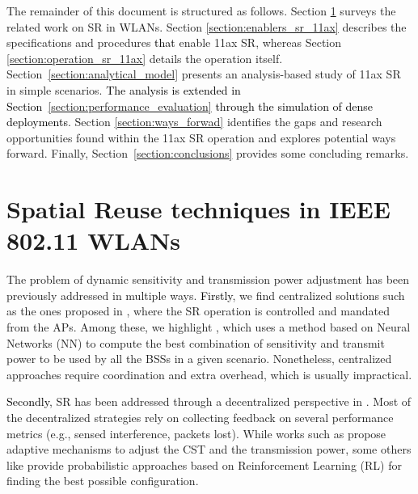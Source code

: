 \documentclass[preprint,12pt]{elsarticle}
\begin{document}
The remainder of this document is structured as follows. Section \ref{section:previous_work_sr} surveys the related work on SR in WLANs. Section \ref{section:enablers_sr_11ax} describes the specifications and procedures \textcolor{black}{that} enable 11ax SR, whereas Section \ref{section:operation_sr_11ax} details the operation itself. Section~\ref{section:analytical_model} presents an analysis-based study of 11ax SR in simple scenarios. \textcolor{black}{The analysis is extended in Section~\ref{section:performance_evaluation} through the simulation of dense deployments}. Section \ref{section:ways_forwad} identifies the gaps and research opportunities found within the 11ax SR operation and explores potential ways forward. Finally, Section~\ref{section:conclusions} provides some concluding remarks.

\section{Spatial Reuse techniques in IEEE 802.11 WLANs}%
\label{section:previous_work_sr}

The problem of dynamic sensitivity and transmission power adjustment has been previously addressed in multiple ways. \textcolor{black}{Firstly}, we find centralized solutions such as the ones proposed in \cite{li2011achieving, jamil2016novel, nakahira2014centralized}, where the SR operation is controlled and mandated from the APs. Among these, we highlight \cite{jamil2016novel}, which uses a method based on Neural Networks (NN) to compute the best combination of sensitivity and transmit power to be used by all the BSSs in a given scenario. Nonetheless, centralized approaches require coordination and extra overhead, which is usually impractical.

\textcolor{black}{Secondly}, SR has been addressed through a decentralized perspective in \cite{chevillat2005dynamic, tang2011improving, chau2017effective, wilhelmi2019collaborative, wilhelmi2019potential}. Most of the decentralized strategies rely on collecting feedback on several performance metrics (e.g., sensed interference, packets lost). While works such as \cite{chevillat2005dynamic, tang2011improving, chau2017effective} propose adaptive mechanisms to adjust the CST and the transmission power, some others like \cite{wilhelmi2019collaborative, wilhelmi2019potential} provide probabilistic approaches based on Reinforcement Learning (RL) for finding the best possible configuration. 
\end{document}
